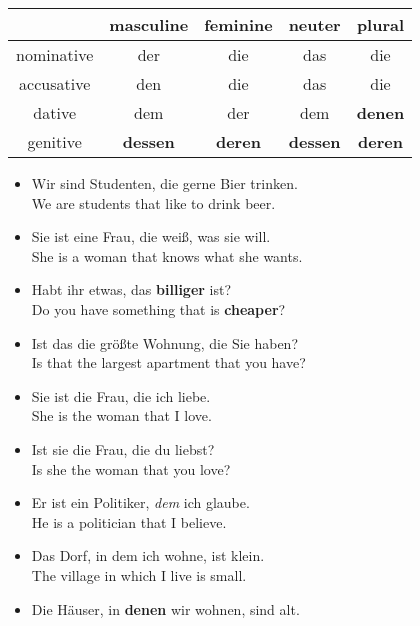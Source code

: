 \begin{center}\begin{tabular}{c|c|c|c|c}
  ~ & masculine & feminine & neuter & plural \\
  \hline
  nominative & der & die & das & die \\
  accusative & den & die & das & die \\
  dative & dem & der & dem & \textbf{denen} \\
  genitive & \textbf{dessen} & \textbf{deren} & \textbf{dessen} & \textbf{deren} \\
\end{tabular}\end{center}

\begin{itemize}
  \item  Wir sind Studenten, die gerne Bier trinken. \\
  We are students that like to drink beer.
  \item  Sie ist eine Frau, die wei{\ss}, was sie will. \\
  She is a woman that knows what she wants.
  \item  Habt ihr etwas, das \textbf{billiger} ist? \\
  Do you have something that is \textbf{cheaper}?
  \item  Ist das die gr{\"o}{\ss}te Wohnung, die Sie haben? \\
  Is that the largest apartment that you have?
  \item  Sie ist die Frau, die ich liebe. \\
  She is the woman that I love.
  \item  Ist sie die Frau, die du liebst? \\
  Is she the woman that you love?
  \item  Er ist ein Politiker, \textit{dem} ich glaube. \\
  He is a politician that I believe.
  \item  Das Dorf, in dem ich wohne, ist klein. \\
  The village in which I live is small.
  \item  Die H{\"a}user, in \textbf{denen} wir wohnen, sind alt. \\

\end{itemize}
